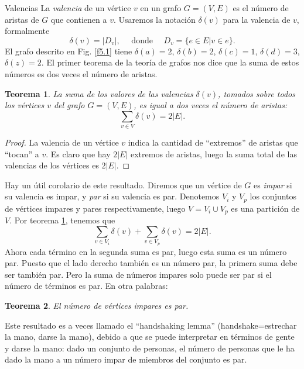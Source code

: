 \documentclass[11pt,spanish,makeidx]{amsbook}
\newtheorem{teorema}{Teorema}[section]
\theoremstyle{definition}
\theoremstyle{remark}
\begin{document}
\begin{section}{Valencias}\label{5.3}
La {\em {valencia}} de un vértice $v$ en un grafo $G=(V,E)$ es el  número de aristas de $G$ que contienen a $v$. Usaremos la notación $\delta(v)$ para la valencia de $v$, formalmente
$$
\delta(v)=|D_v|, \quad \text{ donde } \quad D_v=\{e \in E| v\in
e\}.
$$
El grafo descrito en Fig. \ref{f5.1} tiene $\delta(a)=2$, $\delta(b)=2$, $\delta(c)=1$, $\delta(d)=3$, $\delta(z)=2$. El primer teorema de la teoría de grafos nos dice que la suma de estos números es dos veces el número de aristas.

\begin{teorema}\label{t5.3} La suma de los valores de las valencias $\delta(v)$, tomados sobre todos los vértices $v$ del grafo $G=(V,E)$, es igual a dos veces el número de aristas:
$$
\sum_{v \in V} \delta(v) = 2|E|.
$$
\end{teorema}
\begin{proof} La valencia de un vértice $v$ indica la cantidad de ``extremos'' de aristas que ``tocan'' a $v$. Es claro que hay $2|E|$ extremos de aristas, luego la suma total de las valencias de los vértices es $2|E|$.
\end{proof}

Hay un útil corolario de este resultado. Diremos que un vértice de $G$ es {\em impar} si su     valencia es impar, y {\em par} si su valencia es par. Denotemos $V_i$ y $V_p$ los conjuntos de vértices impares y pares respectivamente, luego $V=V_i \cup V_p$ es una partición de $V$. Por teorema \ref{t5.3}, tenemos que
$$
\sum_{v \in V_i} \delta(v) + \sum_{v \in V_p} \delta(v)= 2|E|.
$$
Ahora cada término en la segunda suma es par, luego esta suma es un número par. Puesto que el lado derecho también es un número par, la primera suma debe ser también par. Pero la suma de números impares solo puede ser par si el número de términos es par. En otra palabras:

\begin{teorema} El número de vértices impares es par.
\end{teorema}

Este resultado es a veces llamado el ``handshaking lemma'' (handshake=estrechar la mano, darse la   mano), debido a que se puede interpretar en términos de gente y darse la mano: dado un conjunto de personas, el número de personas que le ha dado la mano a un número impar de miembros del conjunto es par. 


\end{section}
\end{document}
